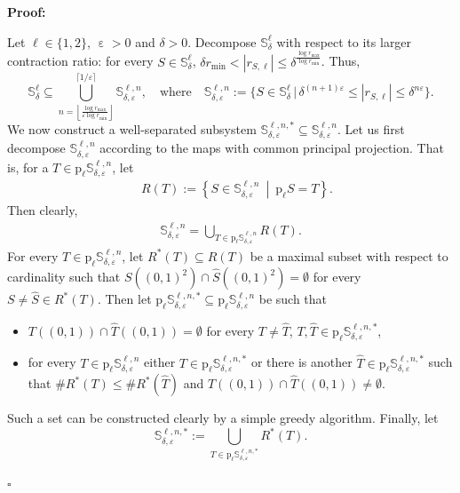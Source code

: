 \documentclass[a4paper, 11pt]{article}
\newenvironment{Proof}{\noindent \textbf{Proof:}}{\hfill$\square$\\}
\DeclareMathOperator{\eps}{\varepsilon}
\numberwithin{equation}{section}
\theoremstyle{plain}
\theoremstyle{remark}
\theoremstyle{definition}
\begin{document}
\vspace{5pt}

\begin{Proof}

Let $\ell\in\{1,2\}$, $\eps > 0$ and $\delta > 0$. Decompose $\mathbb{S}_\delta^\ell$ with respect to its larger contraction ratio: for every $S\in\mathbb{S}_\delta^\ell$, $\delta r_{\min} < |r_{S,\ell}|\leq \delta^{\frac{\log r_{\max}}{\log r_{\min}}}$. Thus,
\begin{equation*}
\mathbb{S}_\delta^\ell \subseteq \bigcup_{n=\left\lfloor\frac{\log r_{\max}}{\varepsilon\log r_{\min}}\right\rfloor}^{\lceil1/\varepsilon\rceil}\mathbb{S}_{\delta, \varepsilon}^{\ell, n}, \quad \text{where} \quad \mathbb{S}_{\delta, \varepsilon}^{\ell, n} := \Big\{S \in \mathbb{S}_\delta^\ell \, \Big|\, \delta^{(n+1)\varepsilon}\leq|r_{S,\ell}|\leq\delta^{n\varepsilon} \Big\}.
\end{equation*}
We now construct a well-separated subsystem $\mathbb{S}_{\delta, \varepsilon}^{\ell, n, *} \subseteq \mathbb{S}_{\delta, \varepsilon}^{\ell, n}$. Let us first decompose $\mathbb{S}_{\delta, \varepsilon}^{\ell, n}$ according to the maps with common principal projection. That is, for a $T \in \mathrm{p}_\ell \mathbb{S}_{\delta, \varepsilon}^{\ell, n}$, let
\begin{align*}
	 \quad R(T) := \left\{ S \in \mathbb{S}_{\delta, \varepsilon}^{\ell, n} \ \middle| \ \mathrm{p}_\ell S = T\right\}.
\end{align*}
Then clearly,
\begin{align*}
    \mathbb{S}_{\delta, \varepsilon}^{\ell, n} = \bigcup_{T \in \mathrm{p}_\ell \mathbb{S}_{\delta, \varepsilon}^{\ell, n}} R(T).
\end{align*}
For every $T \in \mathrm{p}_\ell \mathbb{S}_{\delta, \varepsilon}^{\ell, n}$, let $R^*(T) \subseteq R(T)$ be a maximal subset with respect to cardinality such that $S((0,1)^2)\cap \hat{S}((0,1)^2)=\emptyset$ for every $S\neq\hat{S}\in R^*(T)$. Then let $\mathrm{p}_\ell\mathbb{S}_{\delta, \varepsilon}^{\ell, n,*} \subseteq \mathrm{p}_\ell \mathbb{S}_{\delta, \varepsilon}^{\ell, n}$ be such that
\begin{itemize}
\item $T((0,1)) \cap \hat{T}((0,1)) = \emptyset$ for every $T \neq \hat{T}$, $T, \hat{T} \in \mathrm{p}_\ell\mathbb{S}_{\delta, \varepsilon}^{\ell, n,*}$,
\item for every $T \in \mathrm{p}_\ell\mathbb{S}_{\delta, \varepsilon}^{\ell, n}$ either $T \in \mathrm{p}_\ell\mathbb{S}_{\delta, \varepsilon}^{\ell, n,*}$ or there is another $\hat{T} \in \mathrm{p}_\ell\mathbb{S}_{\delta, \varepsilon}^{\ell, n,*}$ such that $\#R^*(T) \leq \#R^*(\hat{T})$ and $T((0,1))\cap \hat{T}((0,1)) \neq \emptyset$.
\end{itemize}
Such a set can be constructed clearly by a simple greedy algorithm. Finally, let
\begin{equation*}
\mathbb{S}_{\delta, \varepsilon}^{\ell, n, *} := \bigcup_{T \in \mathrm{p}_\ell\mathbb{S}_{\delta, \varepsilon}^{\ell, n, *}} R^*(T).
\end{equation*}



\end{Proof}
\end{document}
